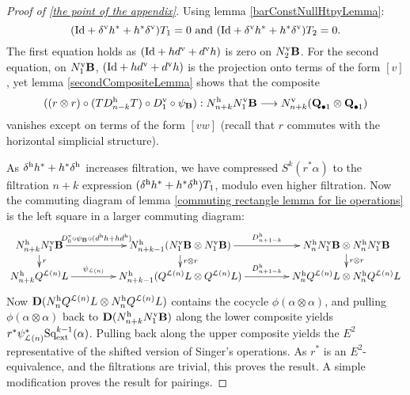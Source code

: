 \documentclass[11pt]{amsart}
\theoremstyle{plain}
\theoremstyle{definition}
\let\oldphi\phi
\let\phi\varphi
\renewcommand{\to}{\longrightarrow}
\newcommand{\calL}{\mathcal{L}}
\theoremstyle{plain}
\newcommand{\ExtCohOp}{\textup{Sq}_\textup{ext}}
\newcommand{\dual}{\mathbf{D}}
\begin{document}
\begin{appendices}
\begin{proof}[Proof of \ref{the point of the appendix}]
Using lemma \ref{barConstNullHtpyLemma}:
\[(\textup{Id}+\delta^\textup{v}h^*+ h^*\delta^\textup{v})T_1=0\textup{ and }(\textup{Id}+\delta^\textup{v}h^*+ h^*\delta^\textup{v})T_2=0.\]
The first equation holds as $(\textup{Id}+hd^\textup{v}+d^\textup{v}h)$ is zero on $N^\textup{v}_2\textbf{B}$. For the second equation, on $N^\textup{v}_1\textbf{B}$,  $(\textup{Id}+hd^\textup{v}+d^\textup{v}h)$ is the projection onto terms of the form $[v]$, yet lemma \ref{secondCompositeLemma} shows that the composite
\[((r\otimes r)\circ(TD^\textup{h}_{n-k}T)\circ D^\textup{v}_1\circ\psi_{\textup{\textbf{B}}}): N^\textup{h}_{n+k}N^\textup{v}_1\textbf{B}\to N^\textup{v}_{n+k}(\textbf{Q}_{\bullet1}\otimes \textbf{Q}_{\bullet1})\]
vanishes except on terms of the form $[vw]$ (recall that $r$ commutes with the horizontal simplicial structure).

As $\delta^\textup{h}h^*+ h^*\delta^\textup{h}$ increases filtration, we have compressed $S^k(r^*\alpha)$ to the filtration $n+k$ expression $(\delta^\textup{h}h^*+ h^*\delta^\textup{h})T_1$, modulo even higher filtration.
Now the commuting diagram of lemma \ref{commuting rectangle lemma for lie operations} is the left square in a larger commuting diagram:
\[\xymatrix@R=4mm@C=15mm{
N_{n+k}^\textup{h}N_1^\textup{v}\textbf{B} \ar[d]^-{r}
 \ar[r]^-{D^\textup{v}_0\circ\psi_{\textup{\textbf{B}}}\circ (d^\textup{h}h+hd^\textup{h})}&%
N_{n+k-1}^\textup{h}(N_1^\textup{v}\textbf{B}\otimes N_1^\textup{v}\textbf{B})\ar[d]^-{r\otimes r}\ar[r]^-{ D^\textup{h}_{n+1-k}}
&
N^\textup{h}_nN^\textup{v}_1\textbf{B}\otimes N^\textup{h}_nN^\textup{v}_1\textbf{B}\ar[d]^-{r\otimes r}
\\%
N_{n+k}^\textup{h}Q^{\calL(n)} L  \ar[r]^-{\psi_{\calL(n)}}&%
N_{n+k-1}^\textup{h}(Q^{\calL(n)} L \otimes Q^{\calL(n)} L )
\ar[r]^-{ D^\textup{h}_{n+1-k}}
&
N^\textup{h}_nQ^{\calL(n)} L \otimes N^\textup{h}_nQ^{\calL(n)} L 
}\]
Now $\dual(N^\textup{h}_nQ^{\calL(n)} L \otimes N^\textup{h}_nQ^{\calL(n)} L )$ contains the cocycle $\oldphi(\alpha\otimes\alpha)$, and pulling $\oldphi(\alpha\otimes\alpha)$ back to $\dual(N_{n+k}^\textup{h}N_1^\textup{v}\textbf{B})$ along the lower composite yields $r^*\psi_{\calL(n)}^*\ExtCohOp^{k-1}(\alpha)$. Pulling back along the upper composite yields the $E^2$ representative of the shifted version of Singer's operations. As $r^*$ is an $E^2$-equivalence, and the filtrations are trivial, this proves the result. A simple modification proves the result for pairings.
\end{proof}


\end{appendices}
\end{document}
